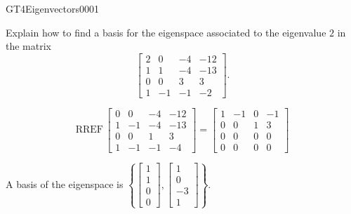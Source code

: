 \newpage




\begin{exercise}{GT4}{Eigenvectors}{0001} 
\begin{exerciseStatement} 

Explain how to find a basis for the eigenspace associated to the eigenvalue \(2\) in the matrix \[\left[\begin{array}{cccc}
2 & 0 & -4 & -12 \\
1 & 1 & -4 & -13 \\
0 & 0 & 3 & 3 \\
1 & -1 & -1 & -2
\end{array}\right].\]

 \end{exerciseStatement}
 \begin{exerciseAnswer} 

\[\mathrm{RREF}\,\left[\begin{array}{cccc}
0 & 0 & -4 & -12 \\
1 & -1 & -4 & -13 \\
0 & 0 & 1 & 3 \\
1 & -1 & -1 & -4
\end{array}\right]=\left[\begin{array}{cccc}
1 & -1 & 0 & -1 \\
0 & 0 & 1 & 3 \\
0 & 0 & 0 & 0 \\
0 & 0 & 0 & 0
\end{array}\right]\]

 

A basis of the eigenspace is \(\left\{ \left[\begin{array}{c}
1 \\
1 \\
0 \\
0
\end{array}\right] , \left[\begin{array}{c}
1 \\
0 \\
-3 \\
1
\end{array}\right] \right\}\).

 \end{exerciseAnswer}
 \end{exercise}



